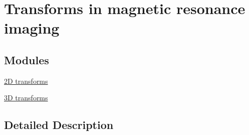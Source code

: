 \hypertarget{group__applications__mri}{\section{Transforms in magnetic resonance imaging}
\label{group__applications__mri}
}
\subsection*{Modules}
\begin{DoxyCompactItemize}
\item 
\hyperlink{group__applications__mri2d}{2\-D transforms}
\item 
\hyperlink{group__applications__mri3d}{3\-D transforms}
\end{DoxyCompactItemize}


\subsection{Detailed Description}
